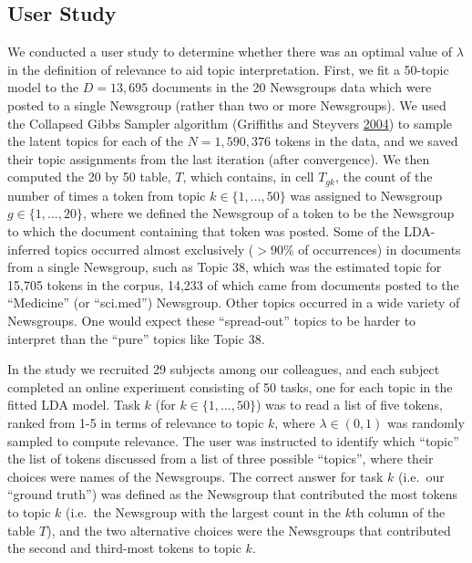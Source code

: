 \documentclass[12pt,]{isuthesis}
\begin{document}
\subsection{User Study}\label{section:userstudy}

We conducted a user study to determine whether there was an optimal
value of \(\lambda\) in the definition of relevance to aid topic
interpretation. First, we fit a 50-topic model to the \(D=13,695\)
documents in the 20 Newsgroups data which were posted to a single
Newsgroup (rather than two or more Newsgroups). We used the Collapsed
Gibbs Sampler algorithm (Griffiths and Steyvers
\protect\hyperlink{ref-Griffiths}{2004}) to sample the latent topics for
each of the \(N=1,590,376\) tokens in the data, and we saved their topic
assignments from the last iteration (after convergence). We then
computed the 20 by 50 table, \(T\), which contains, in cell \(T_{gk}\),
the count of the number of times a token from topic
\(k \in \{1, ..., 50\}\) was assigned to Newsgroup
\(g \in \{1, ..., 20\}\), where we defined the Newsgroup of a token to
be the Newsgroup to which the document containing that token was posted.
Some of the LDA-inferred topics occurred almost exclusively (\(>90\)\%
of occurrences) in documents from a single Newsgroup, such as Topic 38,
which was the estimated topic for 15,705 tokens in the corpus, 14,233 of
which came from documents posted to the ``Medicine'' (or ``sci.med'')
Newsgroup. Other topics occurred in a wide variety of Newsgroups. One
would expect these ``spread-out'' topics to be harder to interpret than
the ``pure'' topics like Topic 38.

In the study we recruited 29 subjects among our colleagues, and each
subject completed an online experiment consisting of 50 tasks, one for
each topic in the fitted LDA model. Task \(k\) (for
\(k \in \{1, ..., 50\}\)) was to read a list of five tokens, ranked from
1-5 in terms of relevance to topic \(k\), where \(\lambda \in (0, 1)\)
was randomly sampled to compute relevance. The user was instructed to
identify which ``topic'' the list of tokens discussed from a list of
three possible ``topics'', where their choices were names of the
Newsgroups. The correct answer for task \(k\) (i.e.~our ``ground
truth'') was defined as the Newsgroup that contributed the most tokens
to topic \(k\) (i.e.~the Newsgroup with the largest count in the \(k\)th
column of the table \(T\)), and the two alternative choices were the
Newsgroups that contributed the second and third-most tokens to topic
\(k\).
\end{document}
